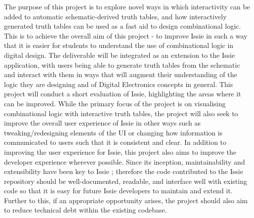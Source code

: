 The purpose of this project is to explore novel ways in which interactivity can be added to automatic schematic-derived truth tables, and how interactively generated truth tables can be used as a fast aid to design combinational logic. This is to achieve the overall aim of this project - to improve Issie in such a way that it is easier for students to understand the use of combinational logic in digital design.
The deliverable will be integrated as an extension to the Issie application, with users being able to generate truth tables from the schematic and interact with them in ways that will augment their understanding of the logic they are designing and of Digital Electronics concepts in general. 
This project will conduct a short evaluation of Issie, highlighting the areas where it can be improved. While the primary focus of the project is on visualising combinational logic with interactive truth tables, the project will also seek to improve the overall user experience of Issie in other ways such as tweaking/redesigning elements of the UI or changing how information is communicated to users such that it is consistent and clear. 
In addition to improving the user experience for Issie, this project also aims to improve the developer experience wherever possible. Since its inception, maintainability and extensibility have been key to Issie \cite{marco_diss}; therefore the code contributed to the Issie repository should be well-documented, readable, and interface well with existing code so that it is easy for future Issie developers to maintain and extend it. Further to this, if an appropriate opportunity arises, the project should also aim to reduce technical debt within the existing codebase.

